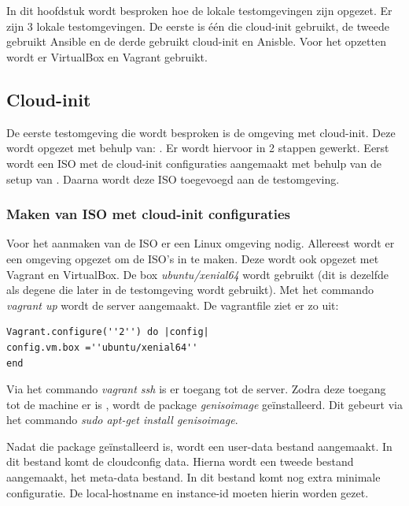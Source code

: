 \chapter{}
\label{ch:testlokaal}

In dit hoofdstuk wordt besproken hoe de lokale testomgevingen zijn opgezet. Er zijn 3 lokale testomgevingen. De eerste is één die cloud-init gebruikt, de tweede gebruikt Ansible en de derde gebruikt cloud-init en Anisble. Voor het opzetten wordt er VirtualBox en Vagrant gebruikt.

\section{Cloud-init}
De eerste testomgeving die wordt besproken is de omgeving met cloud-init. Deze wordt opgezet met behulp van: \autocite{cloudVagrant}. Er wordt hiervoor in 2 stappen gewerkt. Eerst wordt een ISO met de cloud-init configuraties aangemaakt met behulp van de setup van \autocite{cloudVagrant}. Daarna wordt deze ISO toegevoegd aan de testomgeving.

\subsection{Maken van ISO met cloud-init configuraties}
Voor het aanmaken van de ISO er een Linux omgeving nodig. Allereest wordt er een omgeving opgezet om de ISO's in te maken. Deze wordt ook opgezet met Vagrant en VirtualBox. De box \textit{ubuntu/xenial64} wordt gebruikt (dit is dezelfde als degene die later in de testomgeving wordt gebruikt). Met het commando \textit{vagrant up} wordt de server aangemaakt. De vagrantfile ziet er zo uit:
\begin{lstlisting}
Vagrant.configure(''2'') do |config|
config.vm.box =''ubuntu/xenial64''
end
\end{lstlisting}

Via het commando \textit{vagrant ssh} is er toegang tot de server. Zodra deze toegang tot de machine er is , wordt de package \textit{genisoimage} geïnstalleerd. Dit gebeurt via het commando \textit{sudo apt-get install genisoimage}. 

Nadat die package geïnstalleerd is, wordt een user-data bestand aangemaakt. In dit bestand komt de cloudconfig data. Hierna wordt een tweede bestand aangemaakt, het meta-data bestand. In dit bestand komt nog extra minimale configuratie. De local-hostname en instance-id moeten hierin worden gezet.

